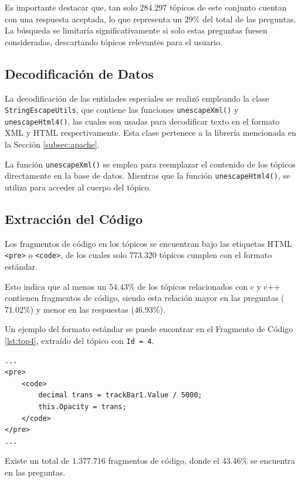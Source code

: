 Es importante destacar que, tan solo $284.297$ tópicos 
de este conjunto cuentan con una respuesta aceptada,
lo que representa un $29\%$ del total de las preguntas.
La búsqueda se limitaría significativamente si solo estas preguntas fuesen consideradas,
descartando tópicos relevantes para el usuario.

\subsection{Decodificación de Datos}
La decodificación de las entidades especiales 
se realizó empleando la clase \lstinline{StringEscapeUtils},
que contiene las funciones \lstinline{unescapeXml()} y \lstinline{unescapeHtml4()},
las cuales son usadas para decodificar texto en el formato 
\ac{XML} y \ac{HTML} respectivamente.
Esta clase pertenece a la librería mencionada en la Sección \ref{subsec:apache}.

La función \lstinline{unescapeXml()} se emplea para reemplazar
el contenido de los tópicos directamente en la base de datos. 
Mientras que la función \lstinline{unescapeHtml4()},
se utiliza para acceder al cuerpo del tópico.

\subsection{Extracción del Código}

Los fragmentos de código en los tópicos se encuentran bajo las etiquetas \ac{HTML} \lstinline{<pre>} o \lstinline{<code>},
de los cuales solo $773.320$ tópicos cumplen con el formato estándar.

Esto indica que al menos un $54.43\%$ de los tópicos relacionados con c y c++ contienen fragmentos de código,
siendo esta relación mayor en las preguntas ($71.02\%$) y menor en las respuestas ($46.93\%$).

\newpage
Un ejemplo del formato estándar se puede encontrar en el Fragmento de Código \ref{lst:top4},
extraído del tópico con \lstinline{Id = 4}.

\begin{lstlisting}[caption={Tópico Ejemplo.},label={lst:top4}]
...
<pre>
	<code>
		decimal trans = trackBar1.Value / 5000;
		this.Opacity = trans;
	</code>
</pre>
...
\end{lstlisting}

Existe un total de $1.377.716$ fragmentos de código, 
donde el $43.46\%$ se encuentra en las preguntas.


